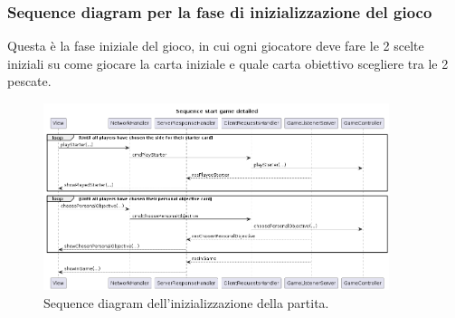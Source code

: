 \documentclass[12pt]{article}
\begin{document}
\subsubsection{Sequence diagram per la fase di inizializzazione del gioco}
Questa è la fase iniziale del gioco, in cui ogni giocatore deve fare le 2 scelte iniziali su come giocare la carta iniziale e quale carta obiettivo scegliere tra le 2 pescate.
\begin{figure}[H]
  \centering
  \includegraphics[width=0.9\textwidth]{img/sequenceStartGameDetailed.png}
  \caption{Sequence diagram dell'inizializzazione della partita.}
  \label{fig:sequenceStartGame}
\end{figure}
\end{document}
